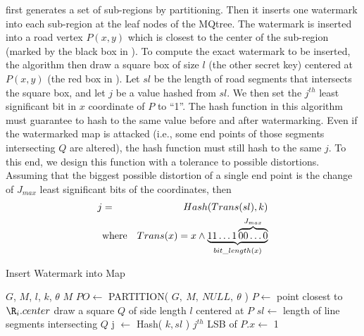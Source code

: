  first generates a set of sub-regions by partitioning. 
Then it inserts one watermark into each sub-region at the leaf nodes of the 
MQtree. The watermark is inserted into a road vertex $P(x, y)$ which is
closest to the center of the sub-region (marked by the black box in 
). To compute the exact watermark to be inserted, the algorithm
then draw a square box of size $l$ (the other secret key) centered at
$P(x, y)$ (the red box in ). Let $sl$ be the length of road
segments that intersects the square box, and let $j$ be a value hashed from
$sl$. We then set the $j^{th}$ least significant bit in $x$ coordinate of $P$ 
to ``1''. The hash function in this algorithm must 
guarantee to hash to the same value before and after watermarking. 
Even if the watermarked map is attacked 
(i.e., some end points of those segments intersecting $Q$ are altered),
the hash function must still hash to the same $j$. To this end, we design this 
function with a tolerance to possible distortions. Assuming that the 
biggest possible distortion of a single end point is the change of
$J_{max}$ least significant bits of the coordinates, then
\begin{eqnarray*}
j&=&Hash(Trans(sl),k) \\
&\rm{where} & Trans(x)= x \land \underbrace {11\ldots1\overbrace {00\ldots0}^{J_{max}} }_{bit\_length(x)} 
\end{eqnarray*}

%

\begin{algorithm}[th]
\caption{Insert Watermark into Map}
\label{algo:Insertion}
\begin{algorithmic}[1]
\Require $G$, $M$, $l$, $k$, $\theta$
\Ensure $M$
\State $PO\leftarrow$ PARTITION( $G,~M,~NULL,~\theta$ )
\State $P\leftarrow$ point closest to ${\R}_{i}.center$
\State draw a square $Q$ of side length $l$ centered at $P$
\State $sl \leftarrow$ length of line segments intersecting $Q$
\State j $\leftarrow$ Hash( $k,sl$ )
\State $j^{th}$ LSB of $P.x \leftarrow$ 1
\EndIf
\EndFor
\EndProcedure
\end{algorithmic}
\end{algorithm}

